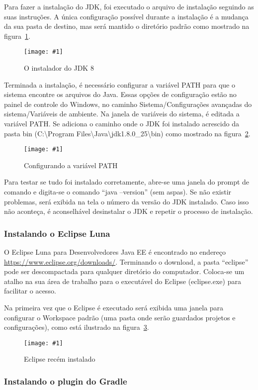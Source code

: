 \documentclass[a4paper,12pt]{article}
\newcommand{\figura}[3] {
	\begin{figure}[H]
		\centering
		\texttt{[image: \#1]}
		\caption{#2}
		\label{#3}
	\end{figure}
	\FloatBarrier
}
\begin{document}
Para fazer a instalação do JDK, foi executado o arquivo de instalação seguindo  as suas instruções. A única configuração possível durante a instalação é a mudança da sua pasta de destino, mas será mantido o diretório padrão como mostrado na figura~\ref{fig:jdk1}.

\figura{jdk81.jpg}{O instalador do JDK 8}{fig:jdk1}

Terminada a instalação, é necessário configurar a variável PATH para que o sistema encontre os arquivos do Java. Essas opções de configuração estão no painel de controle do Windows, no caminho Sistema/Configurações avançadas do sistema/Variáveis de ambiente. Na janela de variáveis do sistema, é editada a variável PATH. Se adiciona o caminho onde o JDK foi instalado acrescido da pasta bin (C:\textbackslash Program Files\textbackslash Java\textbackslash jdk\textmd{1.8.0\_25}\textbackslash bin) como mostrado na figura~\ref{fig:path}.

\figura{path1.png}{Configurando a variável PATH}{fig:path}

Para testar se tudo foi instalado corretamente, abre-se uma janela do prompt de comando e digita-se o comando “java –version” (sem aspas). Se não existir problemas, será exibida na tela o número da versão do JDK instalado. Caso isso não aconteça, é aconselhável desinstalar o JDK e repetir o processo de instalação. 

\subsubsection{Instalando o Eclipse Luna} 

O Eclipse Luna para Desenvolvedores Java EE é encontrado no endereço \url{https://www.eclipse.org/downloads/}. Terminando o download, a pasta “eclipse” pode ser descompactada para qualquer diretório do computador. Coloca-se um atalho na sua área de trabalho para o executável do Eclipse (eclipse.exe) para facilitar o acesso.

Na primeira vez que o Eclipse é executado será exibida uma janela para configurar o Workspace padrão (uma pasta onde serão guardados projetos e configurações), como está ilustrado na figura~\ref{fig:eclipse1}.

\figura{eclipse1.png}{Eclipse recém instalado}{fig:eclipse1}

\subsubsection{Instalando o plugin do Gradle} 
\end{document}
